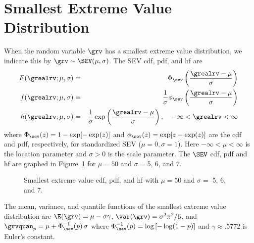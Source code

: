 \section{Smallest Extreme Value Distribution}
\label{section:sev.distribution.definition}
When the random variable $\grv$ has a smallest extreme value
distribution, we indicate this by $\grv \sim \SEV(\mu, \sigma)$. The
SEV cdf, pdf, and hf are
\begin{eqnarray*}  
 F(\grealrv;\mu, \sigma)&=& 	\Phi_{\sev}\left
(\frac{\grealrv-\mu}{\sigma}
\right )
\\
 f(\grealrv;\mu, \sigma)&=&\frac{1}{ \sigma } \phi_{\sev}
\left (
\frac{\grealrv-\mu}{\sigma} \right)
\\
h(\grealrv;\mu, \sigma)&=& \frac{1} {\sigma} \exp \left (
\frac{\grealrv-\mu}{\sigma} \right), \quad -\infty < \grealrv <
\infty
\end{eqnarray*} 
where $\Phi_{\sev}(z)=1-\exp[-\exp(z)]$ and
$\phi_{\sev}(z)=\exp[z-\exp(z)]$ are the cdf and pdf, respectively, for
standardized SEV ($\mu=0, \sigma=1$). Here $-\infty < \mu < \infty$ is
the location parameter and $\sigma > 0$ is the scale parameter.  The
$\SEV$ cdf, pdf and hf
are graphed in Figure~\ref{figure:distplot.sev.ps} for
$\mu=50$ and $\sigma=$5, 6, and 7.
\begin{figure}
\caption{Smallest extreme value 
cdf, pdf, and hf with $\mu=50$ and  $\sigma=$ 5, 6, and 7.}
\label{figure:distplot.sev.ps}
\end{figure}

The mean, variance, and quantile functions of the smallest extreme
value distribution are $\E(\grv)= \mu - \sigma \gamma$, $\var(\grv)=
\sigma^{2} \pi^{2}/6$, and $\grvquan_{p}=\mu + \Phi^{-1}_{\sev}(p) \,
\sigma$ where $\Phi^{-1}_{\sev}(p)=\log \left [-\log(1-p) \right ]$
and $\gamma \approx .5772$ is Euler's constant.

